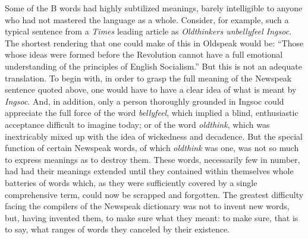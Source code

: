 Some of the B words had highly subtilized meanings, barely intelligible
to anyone who had not mastered the language as a whole. Consider, for
example, such a typical sentence from a \emph{Times} leading article as
\emph{Oldthinkers unbellyfeel Ingsoc}. The shortest rendering that one
could make of this in Oldspeak would be: ``Those whose ideas were formed
before the Revolution cannot have a full emotional understanding of the
principles of English Socialism.'' But this is not an adequate
translation. To begin with, in order to grasp the full meaning of the
Newspeak sentence quoted above, one would have to have a clear idea of
what is meant by \emph{Ingsoc}. And, in addition, only a person
thoroughly grounded in Ingsoc could appreciate the full force of the
word \emph{bellyfeel}, which implied a blind, enthusiastic acceptance
difficult to imagine today; or of the word \emph{oldthink}, which was
inextricably mixed up with the idea of wickedness and decadence. But the
special function of certain Newspeak words, of which \emph{oldthink} was
one, was not so much to express meanings as to destroy them. These
words, necessarily few in number, had had their meanings extended until
they contained within themselves whole batteries of words which, as they
were sufficiently covered by a single comprehensive term, could now be
scrapped and forgotten. The greatest difficulty facing the compilers of
the Newspeak dictionary was not to invent new words, but, having
invented them, to make sure what they meant: to make sure, that is to
say, what ranges of words they canceled by their existence.

